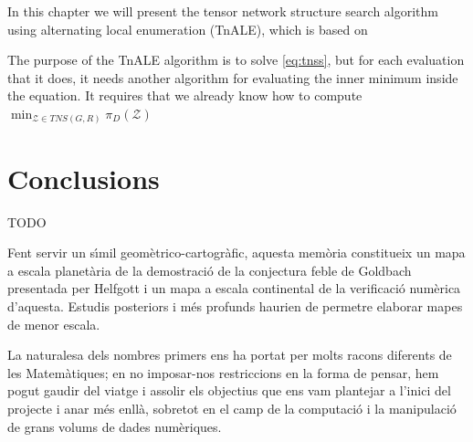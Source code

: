 \documentclass[11pt,a4paper,openright,oneside]{book}
\numberwithin{equation}{section}
\begin{document}
{In this chapter we will present the tensor network structure search algorithm using alternating local enumeration (TnALE), which is based
on \cite{liAlternatingLocalEnumeration2023a}

The purpose of the TnALE algorithm is to solve \ref{eq:tnss}, but for each evaluation that it does, it needs another algorithm for evaluating
the inner minimum inside the equation. It requires that we already know how to compute $\min_{\mathcal{Z} \in TNS(G,R)} \pi_D (\mathcal{Z})$









\chapter{Conclusions}

TODO

Fent servir un s\'{\i}mil geom\`etrico-cartogr\`afic, aquesta mem\`oria constitueix un mapa a escala planet\`aria de la demostraci\'o de la conjectura feble de Goldbach presentada per Helfgott i un mapa a escala continental de la verificaci\'o num\`erica d'aquesta. Estudis posteriors i m\'es profunds haurien de permetre elaborar mapes de menor escala.

La naturalesa dels nombres primers ens ha portat per molts racons diferents de les Matem\`atiques; en no imposar-nos restriccions en la forma de pensar, hem pogut gaudir del viatge i assolir els objectius que ens vam plantejar a l'inici del projecte i anar m\'es enll\`a, sobretot en el camp de la computaci\'o i la manipulaci\'o de grans volums de dades num\`eriques.

}
\end{document}
